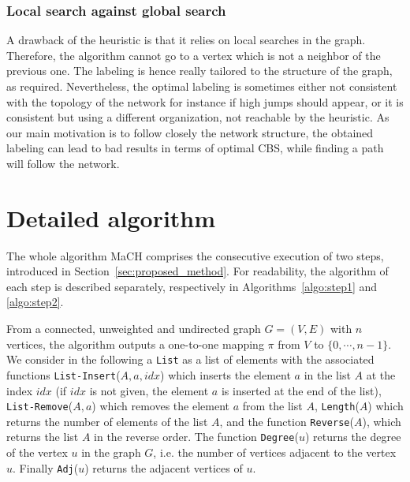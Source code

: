 \documentclass{scrartcl}
\theoremstyle{plain}
\newcommand{\algo}{MaCH}
\newcommand{\cbs}{CBS}
\begin{document}
\subsubsection{Local search against global search}

A drawback of the heuristic is that it relies on local searches in the graph. 
Therefore, the algorithm cannot go to a vertex which is not a neighbor of the 
previous one. The labeling is hence really tailored to the structure of the 
graph, as required. Nevertheless, the optimal labeling is sometimes either not 
consistent with the topology of the network for instance if high jumps should 
appear, or it is consistent but using a different organization, not reachable by 
the heuristic. As our main motivation is to follow closely the network 
structure, the obtained labeling can lead to bad results in terms of optimal 
\cbs{}, while finding a path will follow the network. 
\makeatletter{}\section{Detailed algorithm}
\label{sec:algorithm}

The whole algorithm \algo{} comprises the consecutive execution of two steps, 
introduced in Section~\ref{sec:proposed_method}. For readability, the 
algorithm of each step is described separately, respectively in 
Algorithms~\ref{algo:step1} and \ref{algo:step2}. 

From a connected, unweighted and undirected graph $G=(V,E)$ with $n$ vertices,  
the algorithm outputs a one-to-one mapping $\pi$ from $V$ to $\{0, \cdots, 
n-1\}$. We consider in the following a \texttt{List} as a list of elements with 
the associated functions \texttt{List-Insert}($A,a, idx$) which inserts the 
element $a$ in the list $A$ at the index $idx$ (if $idx$ is not given, the 
element $a$ is inserted at the end of the list), \texttt{List-Remove}($A,a$) 
which removes the element $a$ from the list $A$, \texttt{Length}($A$) which 
returns the number of elements of the list $A$, and the function 
\texttt{Reverse}($A$), which returns the list $A$ in the reverse order. The 
function \texttt{Degree}($u$) returns the degree of the vertex $u$ in the graph 
$G$, i.e. the number of vertices adjacent to the vertex $u$. Finally 
\texttt{Adj}($u$) returns the adjacent vertices of $u$.
\end{document}
